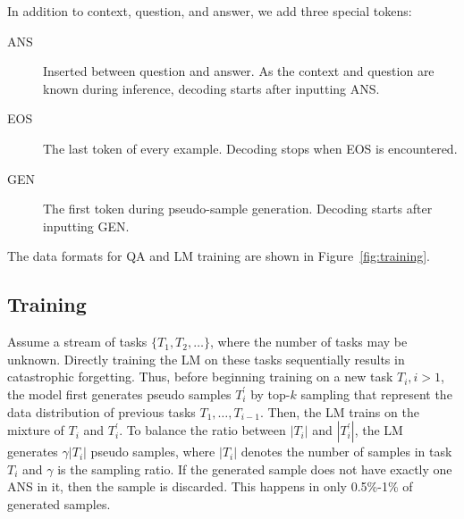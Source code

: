\documentclass{article} %
\begin{document}
In addition to context, question, and answer, we add three special tokens:
\begin{description}
    \item[ANS] Inserted between question and answer. As the context and question are known during inference, decoding starts after inputting ANS.
    \item[EOS] The last token of every example. Decoding stops when EOS is encountered.
    \item[GEN] The first token during pseudo-sample generation. Decoding starts after inputting GEN.
\end{description}
The data formats for QA and LM training are shown in Figure~\ref{fig:training}.


%

\subsection{Training}
Assume a stream of tasks $\{T_1, T_2, \dots\}$, where the number of tasks may be unknown.
Directly training the LM on these tasks sequentially results in catastrophic forgetting.
Thus, before beginning training on a new task $T_i, i > 1$, the model first generates pseudo samples $T^{'}_i$ 
by top-$k$ sampling that represent the data distribution 
of previous tasks $T_1, \dots, T_{i-1}$.
Then, the LM trains on the mixture of $T_i$ and $T^{'}_i$.
To balance the ratio between $|T_i|$ and $|T^{'}_i|$, the LM generates $\gamma |T_i|$ pseudo samples, where $|T_i|$ denotes the number of samples in task $T_i$ and $\gamma$ is the sampling ratio.
If the generated sample does not have exactly one ANS in it, then the sample is discarded.
This happens in only 0.5\%-1\% of generated samples.
\end{document}
